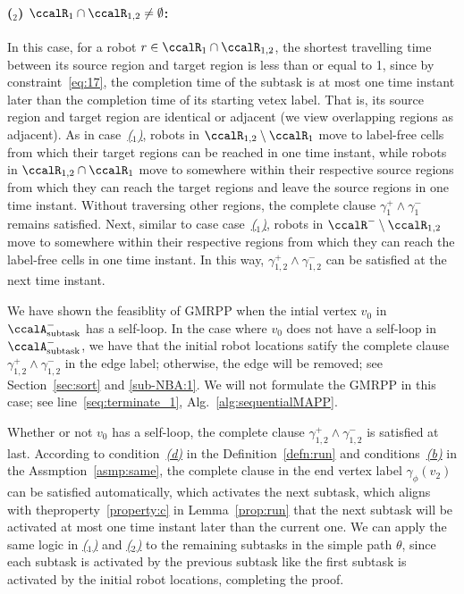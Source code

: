 \documentclass[Afour,sageh,times]{sagej}
\newcounter{mycounter}
\newcommand{\auto}[1]{\ccalA_{\textup{#1}}}
\begin{document}
{{\paragraph{($_2$) $\ccalR_1 \cap \ccalR_{1,2} \neq \emptyset$:} In this case, for a robot $r \in  \ccalR_1 \cap \ccalR_{1,2}$, the shortest travelling time between its source region and target region is less than or equal to 1, since by constraint~\eqref{eq:17}, the completion time of the subtask is at most one time instant later than the completion time of its starting vetex label. That is, its source  region and target region are identical or adjacent (we view overlapping regions as adjacent). As in case~\hyperref
          [app:gmrpp_a]{\it ($_1$)}, robots in $\ccalR_{1,2} \setminus \ccalR_1$ move to label-free cells from which their target regions can be reached in one time instant, while robots in $\ccalR_{1,2} \cap \ccalR_1$ move to somewhere within their respective source regions from which they can reach the target regions and leave the source regions in one time instant. Without traversing other regions, the complete clause $\gamma_1^+ \wedge \gamma_1^-$ remains satisfied. Next, similar to case case~\hyperref [app:gmrpp_a]{\it ($_1$)}, robots in $\ccalR^-\setminus \ccalR_{1,2}$ move to somewhere within their respective regions from which they can reach the label-free cells in one time instant. In this way, $\gamma_{1,2}^+ \wedge \gamma_{1,2}^-$ can be satisfied at the next time instant.

We have shown the feasiblity of GMRPP when the intial vertex $v_0$ in $\auto{subtask}^-$ has a self-loop. In the case where $v_0$ does not have a self-loop in $\auto{subtask}^-$, we have that the initial robot locations satify the complete clause  $\gamma_{1,2}^+ \wedge \gamma_{1,2}^-$ in the  edge label; otherwise, the edge will be  removed; see Section~\ref{sec:sort} and \ref{sub-NBA:1}. We will not formulate the GMRPP in this case; see line~\ref{seq:terminate_1}, Alg.~\ref{alg:sequentialMAPP}.


Whether or not $v_0$ has a self-loop, the complete clause $\gamma_{1,2}^+ \wedge \gamma_{1,2}^-$ is satisfied at last. According to condition~\hyperref[cond:d]{\it (d)} in the Definition~\ref{defn:run} and conditions~\hyperref[asmp:b]{\it (b)} in the Assmption~\ref{asmp:same}, the complete clause in the end vertex label $\gamma_\phi(v_2)$ can be satisfied automatically, which activates the next subtask, which aligns with theproperty~\ref{property:c} in Lemma~\ref{prop:run} that  the next subtask will be activated at most one time instant later than the current one.  We can apply the same logic in \hyperref [app:gmrpp_a]{\it ($_1$)} and \hyperref [app:gmrpp_a]{\it ($_2$)} to the remaining subtasks in the simple path $\theta$, since each subtask is activated by the previous subtask like the first subtask is activated by the initial robot locations, completing the proof.

}}
\end{document}
